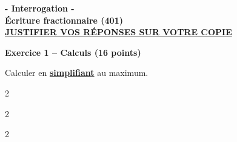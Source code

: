 \documentclass[12pt,a4paper]{exam}
\begin{document}
\begin{center}
\Large \textbf{- Interrogation -\\Écriture fractionnaire (401)}
\vspace{0.5cm}
\\\large \underline{\textbf{JUSTIFIER VOS RÉPONSES SUR VOTRE COPIE}}
\end{center}
\noindent\hrulefill
\vspace{0.5cm}


\textbf{Exercice 1 – Calculs (16 points)}
\vspace{5pt}

\begin{questions}
    \question[8] Calculer en \textbf{\underline{simplifiant}} au maximum.
    \vspace{5pt}
    \begin{multicols}{2}
    \end{multicols}
    \vspace{10pt}
    \begin{multicols}{2}
    \end{multicols}
    \vspace{10pt}
    \begin{multicols}{2}
        \begin{parts}
            \setcounter{partno}{4}

\end{parts}
\end{multicols}
\end{questions}
\end{document}
